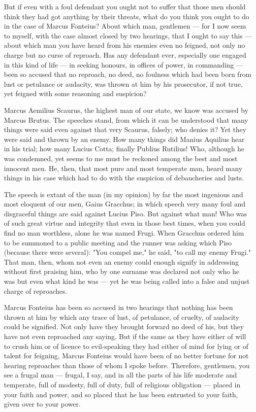  But if even with a foul defendant you ought not to suffer that those men should think they had got anything by their threats, what do you think you ought to do in the case of Marcus Fonteius? About which man, gentlemen --- for I now seem to myself, with the case almost closed by two hearings, that I ought to say this --- about which man you have heard from his enemies even no feigned, not only no charge but no curse of reproach. Has any defendant ever, especially one engaged in this kind of life --- in seeking honours, in offices of power, in commanding --- been so accused that no reproach, no deed, no foulness which had been born from lust or petulance or audacity, was thrown at him by his prosecutor, if not true, yet feigned with some reasoning and suspicion?

 Marcus Aemilius Scaurus, the highest man of our state, we know was accused by Marcus Brutus. The speeches stand, from which it can be understood that many things were said even against that very Scaurus, falsely; who denies it? Yet they were said and thrown by an enemy. How many things did Manius Aquilius hear in his trial; how many Lucius Cotta; finally Publius Rutilius! Who, although he was condemned, yet seems to me must be reckoned among the best and most innocent men. He, then, that most pure and most temperate man, heard many things in his case which had to do with the suspicion of debaucheries and lusts.

 The speech is extant of the man (in my opinion) by far the most ingenious and most eloquent of our men, Gaius Gracchus; in which speech very many foul and disgraceful things are said against Lucius Piso. But against what man! Who was of such great virtue and integrity that even in those best times, when you could find no man worthless, alone he was named Frugi. When Gracchus ordered him to be summoned to a public meeting and the runner was asking which Piso (because there were several): "You compel me," he said, "to call my enemy Frugi." That man, then, whom not even an enemy could enough signify in addressing without first praising him, who by one surname was declared not only who he was but even what kind he was --- yet he was being called into a false and unjust charge of reproaches.

 Marcus Fonteius has been so accused in two hearings that nothing has been thrown at him by which any trace of lust, of petulance, of cruelty, of audacity could be signified. Not only have they brought forward no deed of his, but they have not even reproached any saying. But if the same as they have either of will to crush him or of licence to evil-speaking they had either of mind for lying or of talent for feigning, Marcus Fonteius would have been of no better fortune for not hearing reproaches than those of whom I spoke before. Therefore, gentlemen, you see a frugal man --- frugal, I say, and in all the parts of his life moderate and temperate, full of modesty, full of duty, full of religious obligation --- placed in your faith and power, and so placed that he has been entrusted to your faith, given over to your power.

